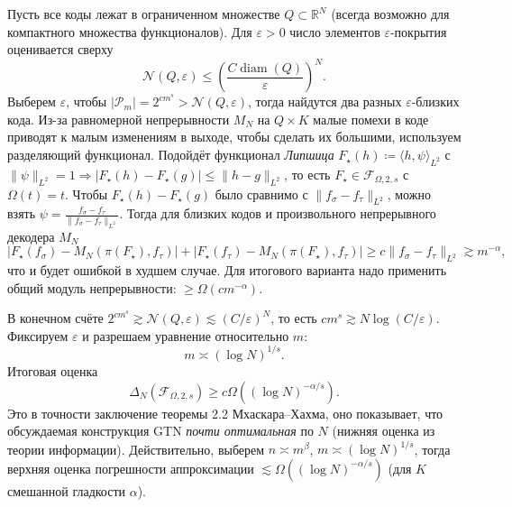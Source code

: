 \documentclass[../NDCNNAI_main.tex]{subfiles}
\begin{document}
Пусть все коды лежат в ограниченном множестве $Q \subset \mathbb{R}^N$ (всегда возможно для компактного множества функционалов).
Для $\varepsilon > 0$ число элементов $\varepsilon$-покрытия оценивается сверху
$$\mathcal{N}(Q, \varepsilon) \le \left( \frac{C \operatorname{diam}(Q)}{\varepsilon} \right)^N.$$
Выберем $\varepsilon$, чтобы $|\mathcal{P}_m| = 2^{c m^s} > \mathcal{N}(Q, \varepsilon)$, тогда найдутся два разных $\varepsilon$-близких кода.
Из-за равномерной непрерывности $M_N$ на $Q \times K$ малые помехи в коде приводят к малым изменениям в выходе, чтобы сделать их большими, используем разделяющий функционал.
Подойдёт функционал \emph{Липшица} $F_\star(h) \coloneq \langle h, \psi \rangle_{L^2}$ с $\|\psi\|_{L^2} = 1 \Rightarrow |F_\star(h) - F_\star(g)| \le \|h - g\|_{L^2}$, то есть $F_\star \in \mathcal{F}_{\Omega,2,s}$ с $\Omega(t) = t$.
Чтобы $F_\star(h) - F_\star(g)$ было сравнимо с $\|f_\sigma - f_\tau\|_{L^2}$, можно взять $\psi = \frac{f_\sigma - f_\tau}{\|f_\sigma - f_\tau\|_{L^2}}$.
Тогда для близких кодов и произвольного непрерывного декодера $M_N$
$$|F_\star(f_\sigma) - M_N(\pi(F_\star), f_\tau)| + |F_\star(f_\tau) - M_N(\pi(F_\star), f_\tau)| \ge c \|f_\sigma - f_\tau\|_{L^2} \gtrsim m^{-\alpha},$$
что и будет ошибкой в худшем случае.
Для итогового варианта надо применить общий модуль непрерывности: $\geq \Omega(c m^{-\alpha})$.

В конечном счёте $2^{c m^s} \gtrsim \mathcal{N}(Q, \varepsilon) \lesssim (C / \varepsilon)^N$, то есть $c m^s \gtrsim N \log(C / \varepsilon)$.
Фиксируем $\varepsilon$ и разрешаем уравнение относительно $m$:
$$m \asymp (\log N)^{1/s}.$$
Итоговая оценка
$$\Delta_N(\mathcal{F}_{\Omega,2,s}) \ge c \Omega\left( (\log N)^{-\alpha/s} \right).$$
Это в точности заключение теоремы 2.2 Мхаскара--Хахма, оно показывает, что обсуждаемая конструкция GTN \emph{почти оптимальная} по $N$ (нижняя оценка из теории информации).
Действительно, выберем $n \asymp m^\beta$, $m \asymp (\log N)^{1/s}$, тогда верхняя оценка погрешности аппроксимации $\lesssim \Omega\left( (\log N)^{-\alpha/s} \right)$ (для $K$ смешанной гладкости $\alpha$).
\end{document}
